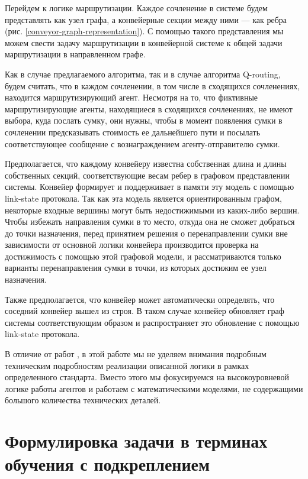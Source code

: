 \documentclass[specification,annotation,times]{itmo-student-thesis}
\theoremstyle{definition}
\begin{document}
Перейдем к логике маршрутизации. Каждое сочленение в системе будем представлять
как узел графа, а конвейерные секции между ними --- как ребра (рис.
\ref{conveyor-graph-representation}). С помощью такого представления мы можем
свести задачу маршрутизации в конвейерной системе к общей задачи маршрутизации в
направленном графе.

Как в случае предлагаемого алгоритма, так и в случае алгоритма Q-routing, будем
считать, что в каждом сочленении, в том числе в сходящихся сочленениях,
находится маршрутизирующий агент. Несмотря на то, что фиктивные маршрутизирующие
агенты, находящиеся в сходящихся сочленениях, не имеют выбора, куда послать
сумку, они нужны, чтобы в момент появления сумки в сочленении предсказывать
стоимость ее дальнейшего пути и посылать соответствующее сообщение с
вознаграждением агенту-отправителю сумки.

Предполагается, что каждому конвейеру известна собственная длина и длины
собственных секций, соответствующие весам ребер в графовом представлении
системы. Конвейер формирует и поддерживает в памяти эту модель с помощью
link-state протокола. Так как эта модель является ориентированным графом,
некоторые входные вершины могут быть недостижимыми из каких-либо вершин. Чтобы
избежать направления сумки в то место, откуда она не сможет добраться до точки
назначения, перед принятием решения о перенаправлении сумки вне зависимости от
основной логики конвейера производится проверка на достижимость с помощью этой
графовой модели, и рассматриваются только варианты перенаправления сумки в
точки, из которых достижим ее узел назначения.

Также предполагается, что конвейер может автоматически определять, что соседний
конвейер вышел из строя. В таком случае конвейер обновляет граф системы
соответствующим образом и распространяет это обновление с помощью link-state
протокола.

В отличие от работ \cite{black2009intelligent, vyatkin-controllers}, в этой
работе мы не уделяем внимания подробным техническим подробностям реализации
описанной логики в рамках определенного стандарта. Вместо этого мы фокусируемся
на высокоуровневой логике работы агентов и работаем с математическими моделями,
не содержащими большого количества технических деталей.

\section{Формулировка задачи в терминах обучения с подкреплением}\label{rl-task-formulation}
\end{document}
